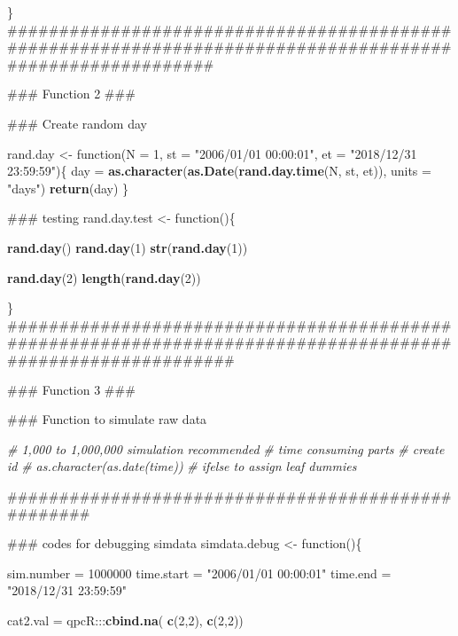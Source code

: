 \documentclass[]{article}
\newenvironment{Shaded}{\begin{snugshade}}{\end{snugshade}}
\newcommand{\KeywordTok}[1]{\textcolor[rgb]{0.13,0.29,0.53}{\textbf{{#1}}}}
\newcommand{\DataTypeTok}[1]{\textcolor[rgb]{0.13,0.29,0.53}{{#1}}}
\newcommand{\DecValTok}[1]{\textcolor[rgb]{0.00,0.00,0.81}{{#1}}}
\newcommand{\StringTok}[1]{\textcolor[rgb]{0.31,0.60,0.02}{{#1}}}
\newcommand{\CommentTok}[1]{\textcolor[rgb]{0.56,0.35,0.01}{\textit{{#1}}}}
\newcommand{\NormalTok}[1]{{#1}}
\begin{document}
\begin{Shaded}
\begin{Highlighting}[]
{{\NormalTok{\}}
\NormalTok{##########################################################################################################}

\NormalTok{### Function 2 ###}

\NormalTok{### Create random day }

\NormalTok{rand.day <-}\StringTok{ }\NormalTok{function(}\DataTypeTok{N =} \DecValTok{1}\NormalTok{, }\DataTypeTok{st =} \StringTok{"2006/01/01 00:00:01"}\NormalTok{, }\DataTypeTok{et =} \StringTok{"2018/12/31 23:59:59"}\NormalTok{)\{}
\NormalTok{day =}\StringTok{ }\KeywordTok{as.character}\NormalTok{(}\KeywordTok{as.Date}\NormalTok{(}\KeywordTok{rand.day.time}\NormalTok{(N, st, et)), }\DataTypeTok{units =} \StringTok{"days"}\NormalTok{)}
\KeywordTok{return}\NormalTok{(day)}
\NormalTok{\}}

\NormalTok{### testing }
\NormalTok{rand.day.test <-}\StringTok{ }\NormalTok{function()\{}
  
\KeywordTok{rand.day}\NormalTok{()}
\KeywordTok{rand.day}\NormalTok{(}\DecValTok{1}\NormalTok{)}
\KeywordTok{str}\NormalTok{(}\KeywordTok{rand.day}\NormalTok{(}\DecValTok{1}\NormalTok{))}

\KeywordTok{rand.day}\NormalTok{(}\DecValTok{2}\NormalTok{)}
\KeywordTok{length}\NormalTok{(}\KeywordTok{rand.day}\NormalTok{(}\DecValTok{2}\NormalTok{))  }

\NormalTok{\}}
\NormalTok{############################################################################################################}

\NormalTok{### Function 3 ###}

\NormalTok{### Function to simulate raw data}

\CommentTok{# 1,000 to 1,000,000 simulation recommended }
\CommentTok{# time consuming parts}
   \CommentTok{# create id}
   \CommentTok{# as.character(as.date(time))}
   \CommentTok{# ifelse to assign leaf dummies}

\NormalTok{###################################################}

\NormalTok{### codes for debugging simdata}
\NormalTok{simdata.debug <-}\StringTok{ }\NormalTok{function()\{}
  
\NormalTok{sim.number =}\StringTok{ }\DecValTok{1000000}
\NormalTok{time.start =}\StringTok{ "2006/01/01 00:00:01"}
\NormalTok{time.end =}\StringTok{ "2018/12/31 23:59:59"}

\NormalTok{cat2.val =}\StringTok{ }\NormalTok{qpcR:::}\KeywordTok{cbind.na}\NormalTok{(             }
  \KeywordTok{c}\NormalTok{(}\DecValTok{2}\NormalTok{,}\DecValTok{2}\NormalTok{),                       }
  \KeywordTok{c}\NormalTok{(}\DecValTok{2}\NormalTok{,}\DecValTok{2}\NormalTok{))}

}}
\end{Highlighting}
\end{Shaded}
\end{document}
